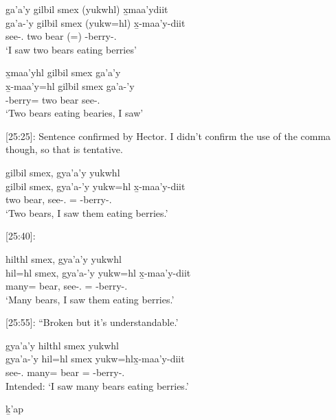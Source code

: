 \begin{exe}
    \ex 
    \begin{xlist}
        \item \glll ga'a'y gilbil smex (yukwhl) x̱maa'ydiit \\
    ga'a-'y gilbil smex (yukw=hl) x̱-maa'y-diit \\
    see-\Fsg{}.\Ii{} two bear (\Prog{}=\Cn{}) \Expr{}-berry-\Tpl{}.\Ii{} \\
    `I saw two bears eating berries'
    \item \glll x̱maa'yhl gilbil smex ga'a'y \\
    x̱-maa'y=hl gilbil smex ga'a-'y \\
    \Expr{}-berry=\Cn{} two bear see-\Fsg{}.\Ii{} \\
    `Two bears eating bearies, I saw'
    \end{xlist}
\end{exe}

[25:25]: Sentence confirmed by Hector. I didn't confirm the use of the comma though, so that is tentative.

\begin{exe}
    \ex \glll gilbil smex, gya'a'y yukwhl  \\
    gilbil smex, gya'a-'y yukw=hl x̱-maa'y-diit \\
    two bear, see-\Fsg{}.\Ii{} \Prog{}=\Cn{} \Expr{}-berry-\Tpl{}.\Ii{} \\
    `Two bears, I saw them eating berries.'
\end{exe}

[25:40]:

\begin{exe}
    \ex \glll hilthl smex, gya'a'y yukwhl  \\
    hil=hl smex, gya'a-'y yukw=hl x̱-maa'y-diit \\
    many=\Cn{} bear, see-\Fsg{}.\Ii{} \Prog{}=\Cn{} \Expr{}-berry-\Tpl{}.\Ii{} \\
    `Many bears, I saw them eating berries.'
\end{exe}

[25:55]: ``Broken but it's understandable.'

\begin{exe}
    \ex \glll * gya'a'y hilthl smex yukwhl  \\
    {} gya'a-'y hil=hl smex  yukw=hlx̱-maa'y-diit \\
    {} see-\Fsg{}.\Ii{} many=\Cn{} bear \Prog{}=\Cn{} \Expr{}-berry-\Tpl{}.\Ii{} \\
    Intended: `I saw many bears eating berries.'
\end{exe}
ḵ'ap

